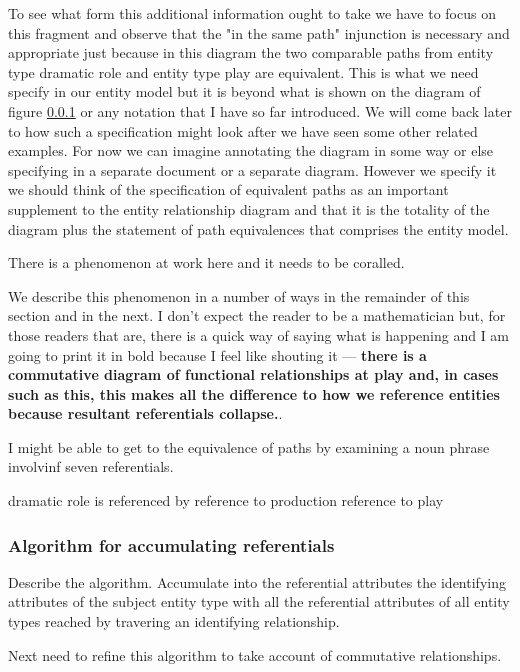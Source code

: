 To see what form this additional information ought to take we have to focus on this fragment
and observe that the "in the same path" injunction is necessary and appropriate just because in this diagram the two comparable paths from entity type dramatic role and entity type play are equivalent.
This is what we need specify in our entity model but it is beyond what is shown on the diagram of figure \ref{} or any notation that I have so far introduced.
We will come back later to how such a specification might look after we have seen some other 
related examples.
For now we can imagine annotating the diagram in some way or else specifying in a separate document
or a separate diagram. However we specify it we should think of the specification of equivalent paths as 
an important supplement to the entity relationship diagram and that it is the totality of the diagram plus the statement of path equivalences that comprises the entity model.

There is a phenomenon at work here and it needs to be coralled.

We describe this phenomenon in a number of ways in the remainder of this section and in the next. 
I don't expect the reader to be a mathematician but, for those readers that are, there is a quick way of saying what is happening and I am going to print it in bold because I feel like shouting it  --- \textbf{there is a commutative diagram of functional relationships at play and, in cases such as this, this makes all the difference to how we reference entities because resultant referentials collapse.}.

\begin{noteforfuture}
I might be able to get to the equivalence of paths by examining
a noun phrase involvinf seven referentials.

dramatic role is referenced by reference to production reference to play
\end{noteforfuture}

\subsubsection{Algorithm for accumulating referentials}

Describe the algorithm.
Accumulate into the referential attributes the identifying attributes of the subject entity type
with all the referential attributes of all entity types reached by travering an identifying relationship.

Next need to refine this algorithm to take account of commutative relationships. 

